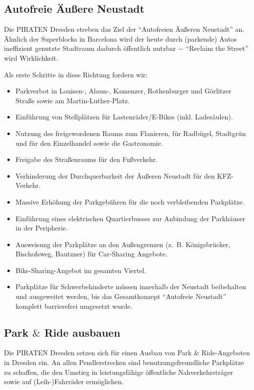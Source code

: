 \documentclass[a4paper, 11pt]{article}
\begin{document}
\subsection{Autofreie Äußere Neustadt}
Die PIRATEN Dresden streben das Ziel der ``Autofreien Äußeren Neustadt'' an. Ähnlich der Superblocks in Barcelona wird der heute durch (parkende) Autos ineffizient genutzte Stadtraum dadurch öffentlich nutzbar $-$ ``Reclaim the Street'' wird Wirklichkeit.\newline

Als erste Schritte in diese Richtung fordern wir:

\begin{itemize}
    \item Parkverbot in Louisen-, Alaun-, Kamenzer, Rothenburger und Görlitzer Straße sowie am Martin-Luther-Platz.
    \item  Einführung von Stellplätzen für Lastenräder/E-Bikes (inkl. Ladesäulen).
    \item  Nutzung des freigewordenen Raums zum Flanieren, für Radbügel, Stadtgrün und für den Einzelhandel sowie die Gastronomie.
    \item  Freigabe des Straßenraums für den Fußverkehr.
    \item  Verhinderung der Durchquerbarkeit der Äußeren Neustadt für den KFZ-Verkehr.
    \item  Massive Erhöhung der Parkgebühren für die noch verbleibenden Parkplätze.
    \item  Einführung eines elektrischen Quartierbusses zur Anbindung der Parkhäuser in der Peripherie.
    \item  Ausweisung der Parkplätze an den Außengrenzen (z. B. Königsbrücker, Bischofsweg, Bautzner) für Car-Sharing Angebote.
    \item Bike-Sharing-Angebot im gesamten Viertel.
    \item Parkplätze für Schwerbehinderte müssen innerhalb der Neustadt beibehalten und ausgeweitet werden, bis das Gesamtkonzept ``Autofreie Neustadt'' komplett barrierefrei umgesetzt wurde.
\end{itemize}


\subsection{Park $\&$ Ride ausbauen}
Die PIRATEN Dresden setzen sich für einen Ausbau von Park $\&$ Ride-Angeboten in Dresden ein. An allen Pendlerstrecken sind benutzungsfreundliche Parkplätze zu schaffen, die den Umstieg in leistungsfähige öffentliche Nahverkehrsträger sowie auf (Leih-)Fahrräder ermöglichen.
\end{document}
